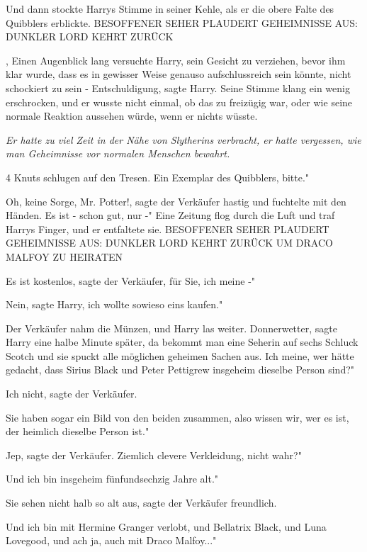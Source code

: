 Und dann stockte Harrys Stimme in seiner Kehle, als er die obere Falte des
Quibblers erblickte. BESOFFENER SEHER PLAUDERT GEHEIMNISSE AUS: DUNKLER LORD
KEHRT ZURÜCK

, Einen Augenblick lang versuchte Harry, sein Gesicht zu verziehen, bevor ihm
klar wurde, dass es in gewisser Weise genauso aufschlussreich sein könnte, nicht
schockiert zu sein - \glqq{}Entschuldigung\grqq{}, sagte Harry. Seine Stimme
klang ein wenig erschrocken, und er wusste nicht einmal, ob das zu freizügig
war, oder wie seine normale Reaktion aussehen würde, wenn er nichts wüsste.

\emph{Er hatte zu viel Zeit in der Nähe von Slytherins verbracht, er hatte
vergessen, wie man Geheimnisse vor normalen Menschen bewahrt.}

4 Knuts schlugen auf den Tresen. \glqq{}Ein Exemplar des Quibblers, bitte."

\glqq{}Oh, keine Sorge, Mr. Potter!\grqq{}, sagte der Verkäufer hastig und
fuchtelte mit den Händen. \glqq{}Es ist - schon gut, nur -" Eine Zeitung flog
durch die Luft und traf Harrys Finger, und er entfaltete sie. BESOFFENER SEHER
PLAUDERT GEHEIMNISSE AUS: DUNKLER LORD KEHRT ZURÜCK UM DRACO MALFOY ZU HEIRATEN

\glqq{}Es ist kostenlos\grqq{}, sagte der Verkäufer, \glqq{}für Sie, ich meine
-"

\glqq{}Nein\grqq{}, sagte Harry, \glqq{}ich wollte sowieso eins kaufen."

Der Verkäufer nahm die Münzen, und Harry las weiter. \glqq{}Donnerwetter\grqq{},
sagte Harry eine halbe Minute später, \glqq{}da bekommt man eine Seherin auf
sechs Schluck Scotch und sie spuckt alle möglichen geheimen Sachen aus. Ich
meine, wer hätte gedacht, dass Sirius Black und Peter Pettigrew insgeheim
dieselbe Person sind?"

\glqq{}Ich nicht\grqq{}, sagte der Verkäufer.

\glqq{}Sie haben sogar ein Bild von den beiden zusammen, also wissen wir, wer es
ist, der heimlich dieselbe Person ist."

\glqq{}Jep\grqq{}, sagte der Verkäufer. \glqq{}Ziemlich clevere Verkleidung,
nicht wahr?"

\glqq{}Und ich bin insgeheim fünfundsechzig Jahre alt."

\glqq{}Sie sehen nicht halb so alt aus\grqq{}, sagte der Verkäufer freundlich.

\glqq{}Und ich bin mit Hermine Granger verlobt, und Bellatrix Black, und Luna
Lovegood, und ach ja, auch mit Draco Malfoy..."

